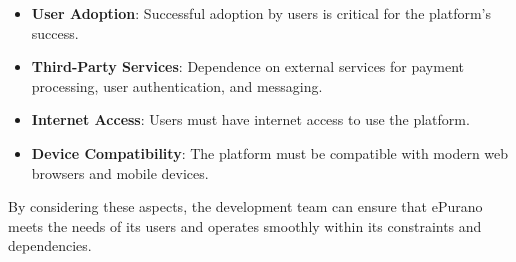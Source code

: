 \begin{itemize}
    \item \textbf{User Adoption}: Successful adoption by users is critical for the platform's success.
    \item \textbf{Third-Party Services}: Dependence on external services for payment processing, user authentication, and messaging.
    \item \textbf{Internet Access}: Users must have internet access to use the platform.
    \item \textbf{Device Compatibility}: The platform must be compatible with modern web browsers and mobile devices.
\end{itemize}

By considering these aspects, the development team can ensure that ePurano meets the needs of its users and operates smoothly within its constraints and dependencies.
